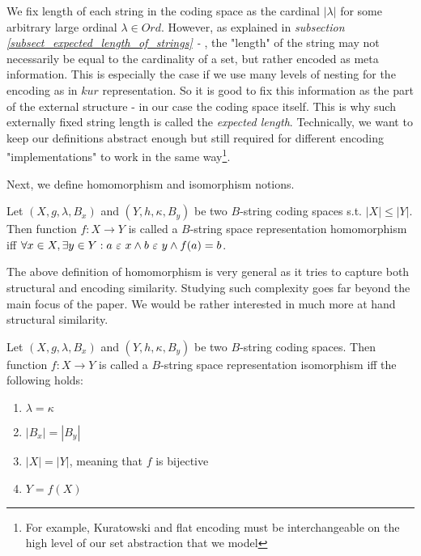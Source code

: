We fix length of each string in the coding space as the cardinal $|\lambda|$ for some arbitrary large ordinal $\lambda \in Ord$. However, as explained in \textit{ subsection \ref{subsect_expected_length_of_strings} - }, the "length" of the string may not necessarily be equal to the cardinality of a set, but rather encoded as meta information. This is especially the case if we use many levels of nesting for the encoding as in $kur$ representation. So it is good to fix this information as the part of the external structure - in our case the coding space itself. This is why such externally fixed string length is called the \textit{expected length}. Technically, we want to keep our definitions abstract enough but still required for different encoding "implementations" to work in the same way\footnote{For example, Kuratowski and flat encoding must be interchangeable on the high level of our set abstraction that we model}.

Next, we define homomorphism and isomorphism notions.

\begin{definition}\label{def_string_homomorphism}
    Let $(X, g, \lambda, B_x)$ and $(Y, h, \kappa, B_y)$ be two $B$-string coding spaces s.t. $|X| \leq |Y|$. Then function $f: X \to Y$ is called a $B$-string space representation homomorphism iff $\forall x \in X, \exists y \in Y: a \ \varepsilon\  x \land b \ \varepsilon\  y \land f(a) = b$.
\end{definition}

The above definition of homomorphism is very general as it tries to capture both structural and encoding similarity. Studying such complexity goes far beyond the main focus of the paper. We would be rather interested in much more at hand structural similarity.

\begin{definition}\label{def_string_isomorphism}
    Let $(X, g, \lambda, B_x)$ and $(Y, h, \kappa, B_y)$ be two $B$-string coding spaces. Then function $f: X \to Y$ is called a $B$-string space representation isomorphism iff the following holds: 
    \begin{enumerate}[label=(\roman*)]
        \item $\lambda = \kappa$
        \item $|B_x| = |B_y|$
        \item $|X| = |Y|$, meaning that $f$ is bijective
        \item $Y = f(X)$
    \end{enumerate}
\end{definition}

